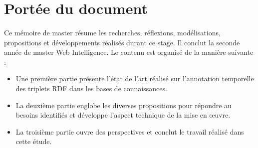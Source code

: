 \section*{Portée du document}
\paragraph{}
Ce mémoire de master résume les recherches, réflexions, modélisations, propositions et développements réalisés durant ce stage. Il conclut la seconde année de master Web Intelligence. Le contenu est organisé de la manière suivante :
\begin{itemize}
\item Une première partie présente l’état de l’art réalisé sur l’annotation temporelle des triplets RDF dans les bases de connaissances.
\item La deuxième partie englobe les diverses propositions pour répondre au besoins identifiés et développe l’aspect technique de la mise en \oe{}uvre.
\item La troisième partie ouvre des perspectives et conclut le travail réalisé dans cette étude.
\end{itemize}